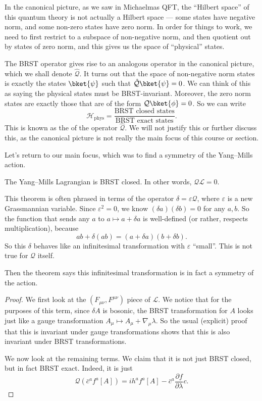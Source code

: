 \documentclass[a4paper]{article}
\begin{document}
In the canonical picture, as we saw in Michaelmas QFT, the ``Hilbert space'' of this quantum theory is not actually a Hilbert space --- some states have negative norm, and some non-zero states have zero norm. In order for things to work, we need to first restrict to a subspace of non-negative norm, and then quotient out by states of zero norm, and this gives us the space of ``physical'' states.

The BRST operator gives rise to an analogous operator in the canonical picture, which we shall denote $\hat{\mathcal{Q}}$. It turns out that the space of non-negative norm states is exactly the states $\bket{\psi}$ such that $\hat{\mathcal{Q}} \bket{\psi} = 0$. We can think of this as saying the physical states must be BRST-invariant. Moreover, the zero norm states are exactly those that are of the form $\mathcal{Q} \bket{\phi} = 0$. So we can write
\[
  \mathcal{H}_{\mathrm{phys}} = \frac{\text{BRST closed states}}{\text{BRST exact states}}.
\]
This is known as the  of the operator $\hat{\mathcal{Q}}$. We will not justify this or further discuss this, as the canonical picture is not really the main focus of this course or section.

Let's return to our main focus, which was to find a symmetry of the Yang--Mills action.
\begin{thm}
  The Yang--Mills Lagrangian is BRST closed. In other words, $\mathcal{Q} \mathcal{L} = 0$.
\end{thm}

This theorem is often phrased in terms of the operator $\delta = \varepsilon \mathcal{Q}$, where $\varepsilon$ is a new Grassmannian variable. Since $\varepsilon^2 = 0$, we know $(\delta a)(\delta b) = 0$ for any $a, b$. So the function that sends any $a$ to $a \mapsto a + \delta a$ is well-defined (or rather, respects multiplication), because
\[
  ab + \delta(ab) = (a + \delta a)(b + \delta b).
\]
So this $\delta$ behaves like an infinitesimal transformation with $\varepsilon$ ``small''. This is not true for $\mathcal{Q}$ itself.

Then the theorem says this infinitesimal transformation is in fact a symmetry of the action.

\begin{proof}
  We first look at the $(F_{\mu\nu}, F^{\mu\nu})$ piece of $\mathcal{L}$. We notice that for the purposes of this term, since $\delta A$ is bosonic, the BRST transformation for $A$ looks just like a gauge transformation $A_\mu \mapsto A_\mu + \nabla_\mu \lambda$. So the usual (explicit) proof that this is invariant under gauge transformations shows that this is also invariant under BRST transformations.

  We now look at the remaining terms. We claim that it is not just BRST closed, but in fact BRST exact. Indeed, it is just
  \[
    \mathcal{Q} (\bar{c}^a f^a[A]) = i h^a f^a[A] - \bar{c}^a \frac{\partial f}{\partial \lambda} c. %
  \]
\end{proof}
\end{document}
